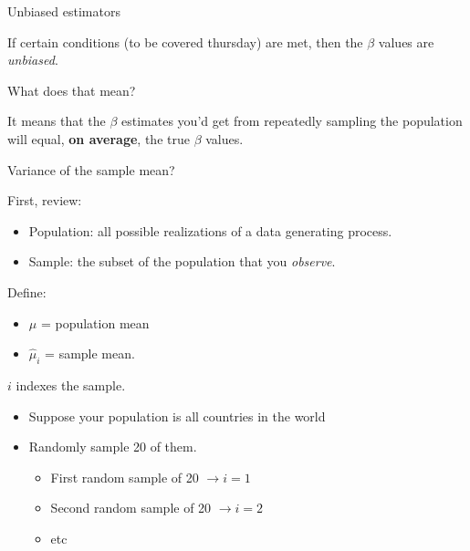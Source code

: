 \documentclass[aspectratio=169]{beamer}
\begin{document}
\begin{frame}{Unbiased estimators}

If certain conditions (to be covered thursday) are met, then the $\beta$ values are \textit{unbiased}.

\vspace{5mm}

What does that mean?

\vspace{5mm}
\pause

It means that the $\beta$ estimates you'd get from repeatedly sampling the population will equal, \textbf{on average}, the true $\beta$ values.

\end{frame}

\begin{frame}{Variance of the sample mean?}

First, review:
\begin{itemize}
\item Population: all possible realizations of a data generating process.  
\item Sample: the subset of the population that you \textit{observe}.  
\end{itemize}

Define:
\begin{itemize}
\item $\mu$ = population mean
\item $\hat{\mu}_i$ = sample mean.  
\end{itemize}

$i$ indexes the sample.  
\begin{itemize}
\item Suppose your population is all countries in the world
\item Randomly sample 20 of them.  
\begin{itemize}
\item First random sample of 20 $\rightarrow i = 1$
\item Second random sample of 20 $\rightarrow i = 2$
\item etc
\end{itemize}
\end{itemize}

\end{frame}
\end{document}
